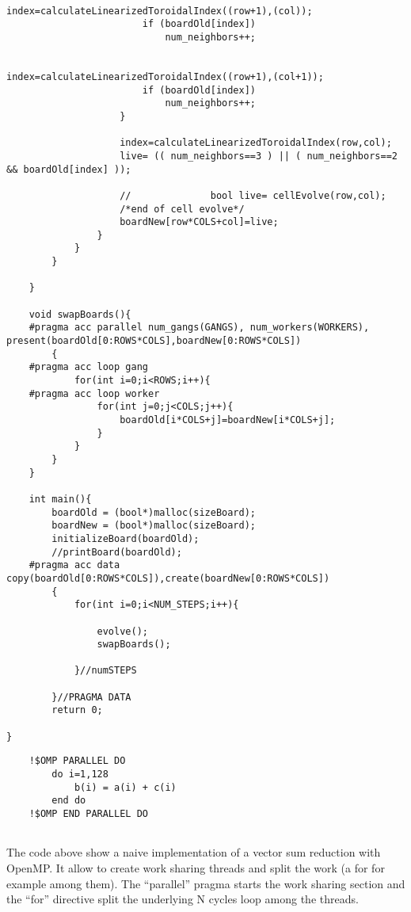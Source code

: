 \begin{lstlisting}
						index=calculateLinearizedToroidalIndex((row+1),(col));
						if (boardOld[index])
							num_neighbors++;
	
						index=calculateLinearizedToroidalIndex((row+1),(col+1));
						if (boardOld[index])
							num_neighbors++;
					}
	
					index=calculateLinearizedToroidalIndex(row,col);
					live= (( num_neighbors==3 ) || ( num_neighbors==2 && boardOld[index] ));
	
					//				bool live= cellEvolve(row,col);
					/*end of cell evolve*/
					boardNew[row*COLS+col]=live;
				}
			}
		}
	
	}
	
	void swapBoards(){
	#pragma acc parallel num_gangs(GANGS), num_workers(WORKERS), present(boardOld[0:ROWS*COLS],boardNew[0:ROWS*COLS])
		{
	#pragma acc loop gang
			for(int i=0;i<ROWS;i++){
	#pragma acc loop worker
				for(int j=0;j<COLS;j++){
					boardOld[i*COLS+j]=boardNew[i*COLS+j];
				}
			}
		}
	}
	
	int main(){
		boardOld = (bool*)malloc(sizeBoard);
		boardNew = (bool*)malloc(sizeBoard);
		initializeBoard(boardOld);
		//printBoard(boardOld);
	#pragma acc data copy(boardOld[0:ROWS*COLS]),create(boardNew[0:ROWS*COLS])
		{
			for(int i=0;i<NUM_STEPS;i++){
	
				evolve();
				swapBoards();
	
			}//numSTEPS
	
		}//PRAGMA DATA
		return 0;

}
    \end{lstlisting} 
    
    
     \begin{lstlisting}
	!$OMP PARALLEL DO 
 		do i=1,128 
 			b(i) = a(i) + c(i) 
 		end do 
	!$OMP END PARALLEL DO 
     

    \end{lstlisting} 
    
    
     The code above show a naive implementation of a vector sum reduction with
     OpenMP. It allow to create work sharing threads and split the work (a for
     for example among them). The ``parallel'' pragma starts the work sharing
     section and the ``for'' directive split the underlying N cycles loop among
     the threads.
     
